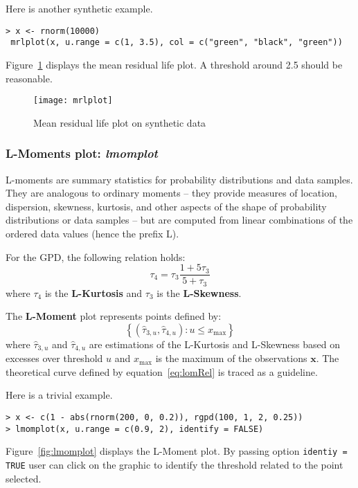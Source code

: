 \documentclass[11pt,a4paper]{article}
\numberwithin{equation}{section}
\begin{document}
Here is another synthetic example.
\begin{verbatim}
> x <- rnorm(10000)
 mrlplot(x, u.range = c(1, 3.5), col = c("green", "black", "green"))
\end{verbatim}

Figure~\ref{fig:mrlplot} displays the mean residual life plot. A
threshold around 2.5 should be reasonable.
\begin{figure}
  \centering
  \texttt{[image: mrlplot]}
  \caption{Mean residual life plot on synthetic data}
  \label{fig:mrlplot}
\end{figure}

\subsubsection{L-Moments plot: \emph{lmomplot}}

L-moments are summary statistics for probability distributions and
data samples. They are analogous to ordinary moments -- they provide
measures of location, dispersion, skewness, kurtosis, and other
aspects of the shape of probability distributions or data samples --
but are computed from linear combinations of the ordered data values
(hence the prefix L).

For the GPD, the following relation holds:
\begin{equation}
  \label{eq:lomRel}
  \tau_4 = \tau_3 \frac{1 + 5 \tau_3}{5 + \tau_3}
\end{equation}
where $\tau_4$ is the \textbf{L-Kurtosis} and $\tau_3$ is the
\textbf{L-Skewness}.

The \textbf{L-Moment} plot represents points defined by:
\begin{equation}
  \label{eq:lmomplot}
  \left\{\left(\hat{\tau}_{3,u}, \hat{\tau}_{4,u}\right) : u \leq
    x_\mathrm{max} \right\}  
\end{equation}
where $\hat{\tau}_{3,u}$ and $\hat{\tau}_{4,u}$ are estimations of the
L-Kurtosis and L-Skewness based on excesses over threshold $u$ and
$x_\mathrm{max}$ is the maximum of the observations $\mathbf{x}$. The
theoretical curve defined by equation~\eqref{eq:lomRel} is traced as a
guideline.

Here is a trivial example.
\begin{verbatim}
> x <- c(1 - abs(rnorm(200, 0, 0.2)), rgpd(100, 1, 2, 0.25))
> lmomplot(x, u.range = c(0.9, 2), identify = FALSE)
\end{verbatim}

Figure~\ref{fig:lmomplot} displays the L-Moment plot. By passing
option \verb+identiy = TRUE+ user can click on the graphic to identify
the threshold related to the point selected.
\end{document}
